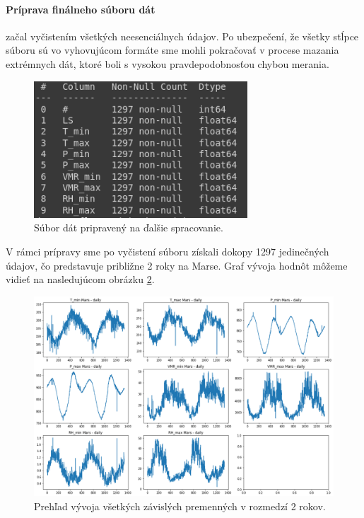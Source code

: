 \paragraph{Príprava finálneho súboru dát} začal vyčistením všetkých neesenciálnych údajov. Po ubezpečení, že všetky stĺpce súboru sú vo vyhovujúcom formáte sme mohli pokračovať v procese mazania extrémnych dát, ktoré boli s vysokou pravdepodobnosťou chybou merania. 
\begin{figure}[!htbp]
  \centering
  \includegraphics[width=8cm]{img/df_final.png}
  \caption{Súbor dát pripravený na ďalšie spracovanie.}
  \label{dest_abs_error}
\end{figure}
\newpage
V rámci prípravy sme po vyčistení súboru získali dokopy 1297 jedinečných údajov, čo predstavuje približne 2 roky na Marse. Graf vývoja hodnôt môžeme vidieť na nasledujúcom obrázku \ref{features1}.
\begin{figure}[!htbp]
  \centering
  \includegraphics[width=14cm]{img/features1.png}
  \caption{Prehľad vývoja všetkých závislých premenných v rozmedzí 2 rokov.}
  \label{features1}
\end{figure}

